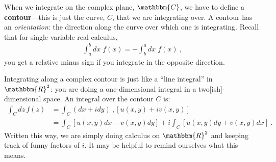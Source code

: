 When we integrate on the complex plane, $\mathbbm{C}$, we have to define a \textbf{contour}---this is just the curve, $C$, that we are integrating over. A contour has an \emph{orientation}: the direction along the curve over which one is integrating. Recall that for single variable real calculus,
\begin{align}
	\int_a^b dx\; f(x) = - \int_b^a dx\; f(x) \ ,
\end{align}
you get a relative minus sign if you integrate in the opposite direction.

Integrating along a complex contour is just like a ``line integral'' in $\mathbbm{R}^2$: you are doing a one-dimensional integral in a two[ish]-dimensional space. An integral over the contour $C$ is:
\begin{align}
	\int_C dz\, f(z) &= 
	\int_C (dx + i dy) \ , \left[u(x,y)+ i v(x,y)\right]
	\\
	&= 
	\int_C \left[u(x,y)dx - v(x,y)dy\right] 
	+ i \int_C \left[u(x,y)dy + v(x,y)dx\right] \ .
\end{align}
Written this way, we are simply doing calculus on $\mathbbm{R}^2$ and keeping track of funny factors of $i$. 
%
It may be helpful to remind ourselves what this means.
